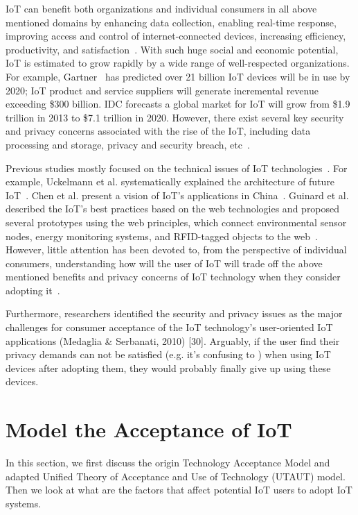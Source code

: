 IoT can benefit both organizations and individual consumers in all above mentioned domains by enhancing data collection, enabling real-time response, improving access and control of internet-connected devices, increasing efficiency, productivity, and satisfaction~\cite{weinberg2015internet, porter2014smart}. With such huge social and economic potential, IoT is estimated to grow rapidly by a wide range of well-respected organizations. For example, Gartner~\cite{eddy2015gartner} has predicted over 21 billion IoT devices will be in use by 2020; IoT product and service suppliers will generate incremental revenue exceeding \$300 billion. IDC forecasts a global market for IoT will grow from \$1.9 trillion in 2013 to \$7.1 trillion in 2020. However, there exist several key security and privacy concerns associated with the rise of the IoT, including data processing and storage, privacy and security breach, etc~\cite{weinberg2015internet, lu2014overview, yu2015handling}.

Previous studies mostly focused on the technical issues of IoT technologies~\cite{fantana2013iot, lazarescu2013design, shang2012internet}. For example, Uckelmann et al. systematically explained the architecture of future IoT~\cite{uckelmann2011architectural}. Chen et al. present a vision of IoT's applications in China~\cite{chen2014vision}. Guinard et al. described the IoT’s best practices based on the web technologies and proposed several prototypes using the web principles, which connect environmental sensor nodes, energy monitoring systems, and RFID-tagged objects to the web~\cite{guinard2011internet}. However, little attention has been devoted to, from the perspective of individual consumers, understanding how will the user of IoT will trade off the above mentioned benefits and privacy concerns of IoT technology when they consider adopting it~\cite{al2016modeling, gao2014unified, mital2018adoption}.

Furthermore, researchers identified the security and privacy issues as the major challenges for consumer acceptance of the IoT technology’s user-oriented IoT applications (Medaglia \& Serbanati, 2010) [30]. Arguably, if the user find their privacy demands can not be satisfied (e.g. it's confusing to ) when using IoT devices after adopting them, they would probably finally give up using these devices.

\section{Model the Acceptance of IoT}
In this section, we first discuss the origin Technology Acceptance Model and adapted Unified Theory of Acceptance and Use of Technology (UTAUT) model. Then we look at what are the factors that affect potential IoT users to adopt IoT systems. 

